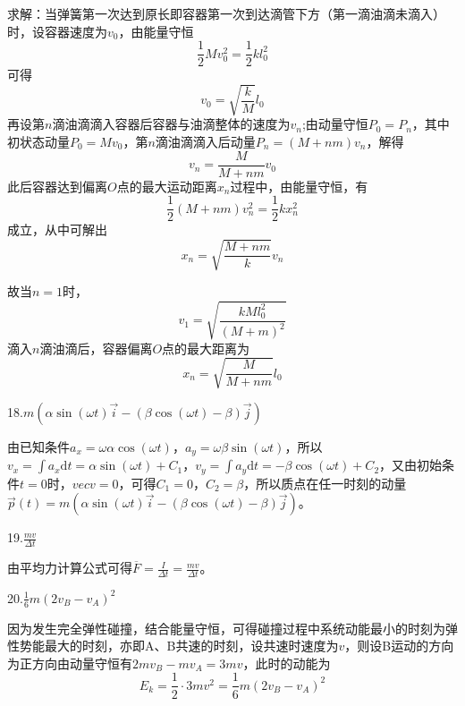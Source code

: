 \documentclass[blue, normal]{./templete/qyxfnote}
\newcommand{\di}[1]{\mathrm{d}#1}
\begin{document}
\begin{multicols}{2}
			求解：当弹簧第一次达到原长即容器第一次到达滴管下方（第一滴油滴未滴入）时，设容器速度为$v_0$，由能量守恒
			\begin{equation*}
			\frac{1}{2}Mv_0^2=\frac{1}{2}kl_0^2
			\end{equation*}
			可得
			\begin{equation*}
			v_0=\sqrt{\frac{k}{M}}l_0
			\end{equation*}
			再设第$n$滴油滴滴入容器后容器与油滴整体的速度为$v_n$;由动量守恒$P_0=P_n$，其中初状态动量$P_0=Mv_0$，第$n$滴油滴滴入后动量$P_n=(M+nm)v_n$，解得
			\begin{equation*}
			v_n=\frac{M}{M+nm}v_0
			\end{equation*}
			此后容器达到偏离$O$点的最大运动距离$x_n$过程中，由能量守恒，有
			\begin{equation*}
			\frac{1}{2}(M+nm)v_n^2=\frac{1}{2}kx_n^2
			\end{equation*}
			成立，从中可解出
			\begin{equation*}
			x_n=\sqrt{\frac{M+nm}{k}}v_n
			\end{equation*}
			
			故当$n=1$时，
			\begin{equation*}
			v_1=\sqrt{\frac{kMl_0^2}{(M+m)^2}}
			\end{equation*}
			滴入$n$滴油滴后，容器偏离$O$点的最大距离为
			\begin{equation*}
			x_n=\sqrt{\frac{M}{M+nm}}l_0
			\end{equation*}
			
			18.$m(\alpha\sin(\omega t)\vec{i}-(\beta\cos(\omega t)-\beta)\vec{j})$
			
			由已知条件$a_x=\omega\alpha\cos(\omega t)，a_y=\omega\beta\sin(\omega t)$，所以$v_x=\int a_x\di t=\alpha\sin(\omega t)+C_1，v_y=\int a_y\di t=-\beta\cos(\omega t)+C_2$，又由初始条件$t=0$时，$vec{v}=0$，可得$C_1=0，C_2=\beta$，所以质点在任一时刻的动量$\vec{p}(t)=m(\alpha\sin(\omega t)\vec{i}-(\beta\cos(\omega t)-\beta)\vec{j})$。
			
			19.$\frac{mv}{\Delta t}$
			
			由平均力计算公式可得$\overline{F}=\frac{I}{\Delta t}=\frac{mv}{\Delta t}$。
			
			20.$\frac{1}{6}m(2v_B-v_A)^2$
			
			因为发生完全弹性碰撞，结合能量守恒，可得碰撞过程中系统动能最小的时刻为弹性势能最大的时刻，亦即A、B共速的时刻，设共速时速度为$v$，则设B运动的方向为正方向由动量守恒有$2mv_B-mv_A=3mv$，此时的动能为
			\begin{equation*}
			E_k=\frac{1}{2}\cdot 3mv^2=\frac{1}{6}m(2v_B-v_A)^2
			\end{equation*}


\end{multicols}
\end{document}
